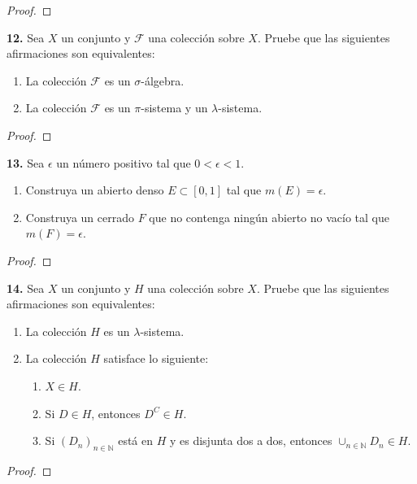 \documentclass{article}
\newenvironment{statement}[1]{\smallskip\noindent\color[rgb]{1.00,0.00,0.50} {\bf #1.}}{}
\theoremstyle{definition}
\theoremstyle{remark}
\newcommand{\BN}{\mathbb N}
\begin{document}
\begin{proof}
\end{proof}

\begin{statement}{12}
  Sea $X$ un conjunto y $\mathcal{F}$ una colecci\'on sobre $X$.
  Pruebe que las siguientes afirmaciones son equivalentes:
  \begin{enumerate}
    \item La colecci\'on $\mathcal{F}$ es un $\sigma$-\'algebra.
    \item La colecci\'on $\mathcal{F}$ es un $\pi$-sistema y un $\lambda$-sistema.
  \end{enumerate}
\end{statement}

\begin{proof}
\end{proof}

\begin{statement}{13}
  Sea $\epsilon$ un n\'umero positivo tal que $0 < \epsilon < 1$.
  \begin{enumerate}
    \item Construya un abierto denso $E \subset [0, 1]$ tal que $m(E) = \epsilon$.
    \item Construya un cerrado $F$ que no contenga ning\'un abierto no vac\'io
    tal que $m(F) = \epsilon$.
  \end{enumerate}
\end{statement}

\begin{proof}
\end{proof}

\begin{statement}{14}
  Sea $X$ un conjunto y $H$ una colecci\'on sobre $X$. Pruebe que las siguientes
  afirmaciones son equivalentes:
  \begin{enumerate}
    \item La colecci\'on $H$ es un $\lambda$-sistema.
    \item La colecci\'on $H$ satisface lo siguiente:
    \begin{enumerate}
      \item $X \in H$.
      \item Si $D \in H$, entonces $D^C \in H$.
      \item Si $(D_n)_{n \in \BN}$ est\'a en $H$ y es disjunta dos a dos,
      entonces $\cup_{n \in \BN} D_n \in H$.
    \end{enumerate}
  \end{enumerate}
\end{statement}

\begin{proof}
\end{proof}
\end{document}
